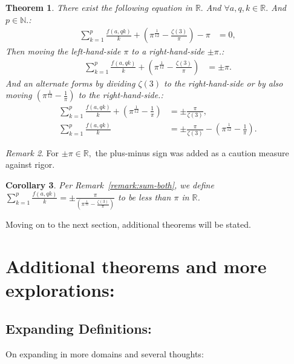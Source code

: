 \documentclass[10pt]{article}
\theoremstyle{plain}
\newtheorem{theorem}{Theorem}[section]
\newtheorem{corollary}[theorem]{Corollary}
\theoremstyle{definition}
\theoremstyle{remark}
\newtheorem{remark}[theorem]{Remark}
\begin{document}
\begin{theorem}
There exist the following equation in $\mathbb{R}.$ And $\forall a, q, k \in \mathbb{R}.$ And $p \in \mathbb{N}.$:
\begin{align*}
	\sum_{k=1}^{p} \frac{f(a, qk)}{k} + (\pi^{\frac{1}{12}} - \frac{\zeta(3)}{\pi}) - \pi &= 0,
\end{align*}
Then moving the left-hand-side $\pi$ to a right-hand-side $\pm \pi$.:
\begin{align*}
	\sum_{k=1}^{p} \frac{f(a, qk)}{k} + (\pi^{\frac{1}{12}} - \frac{\zeta(3)}{\pi}) &= \pm \pi.
\end{align*}
And an alternate forms by dividing $\zeta(3)$ to the right-hand-side or by also moving $(\pi^{\frac{1}{12}} - \frac{1}{\pi})$ to the right-hand-side.:
\begin{align*}
	\sum_{k=1}^{p} \frac{f(a, qk)}{k} + (\pi^{\frac{1}{12}} - \frac{1}{\pi}) &= \pm \frac{\pi}{\zeta(3)},\\
	\sum_{k=1}^{p} \frac{f(a, qk)}{k} &= \pm \frac{\pi}{\zeta(3)} - (\pi^{\frac{1}{12}} - \frac{1}{\pi}) .
\end{align*}
\end{theorem}
\begin{remark}
For $\pm \pi \in \mathbb{R},$ the plus-minus sign was added as a caution measure against rigor.
\end{remark}
\begin{corollary}
Per Remark~\ref{remark:sum-both}, we define $\sum_{k=1}^{p} \frac{f(a, qk)}{k} = \pm \frac{\pi}{(\pi^{\frac{1}{12}} - \frac{\zeta(3)}{\pi})}$ to be less than $\pi$ in $\mathbb{R}$.
\end{corollary} Moving on to the next section, additional theorems will be stated.

\section{Additional theorems and more explorations:}

\subsection{Expanding Definitions:}
On expanding in more domains and several thoughts:
\end{document}
